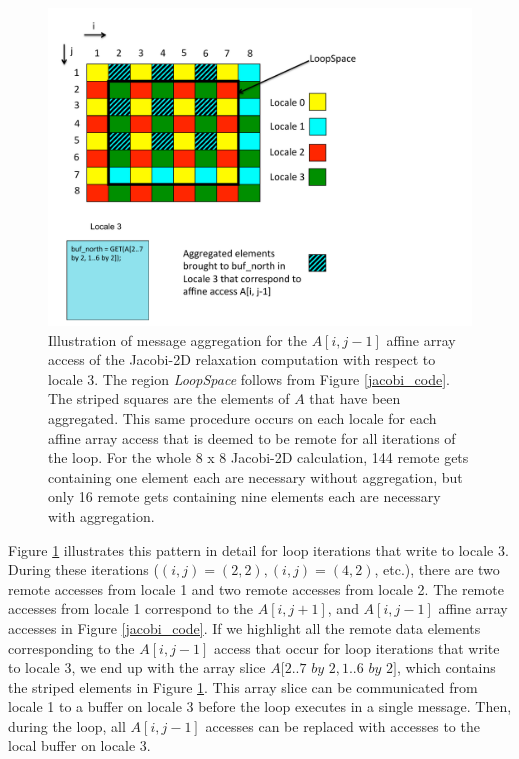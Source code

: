 \begin{figure}
\begin{center}
\includegraphics[scale=0.42]{./Figures/aggregation}
\caption{Illustration of message aggregation for the $A[i, j-1]$ affine array access of the Jacobi-2D relaxation computation with respect to locale 3. The region \textit{LoopSpace} follows from Figure \ref{jacobi_code}. The striped squares are the elements of $A$ that have been aggregated. This same procedure occurs on each locale for each affine array access that is deemed to be remote for all iterations of the loop. For the whole 8 x 8 Jacobi-2D calculation, 144 remote gets containing one element each are necessary without aggregation, but only 16 remote gets containing nine elements each are necessary with aggregation.}
\label{aggregation}
\end{center}
\end{figure}

Figure \ref{aggregation} illustrates this pattern in detail for loop iterations that write to locale 3. During these iterations ($(i, j) = (2, 2), (i, j) = (4, 2)$, etc.), there are two remote accesses from locale 1 and two remote accesses from locale 2. The remote accesses from locale 1 correspond to the $A[i, j+1]$, and $A[i, j-1]$ affine array accesses in Figure \ref{jacobi_code}. If we highlight all the remote data elements corresponding to the $A[i, j-1]$ access that occur for loop iterations that write to locale 3, we end up with the array slice $A[2..7$ $by$ $2, 1..6$ $by$ $2]$, which contains the striped elements in Figure \ref{aggregation}. This array slice can be communicated from locale 1 to a buffer on locale 3 before the loop executes in a single message. Then, during the loop, all $A[i, j-1]$ accesses can be replaced with accesses to the local buffer on locale 3. 

